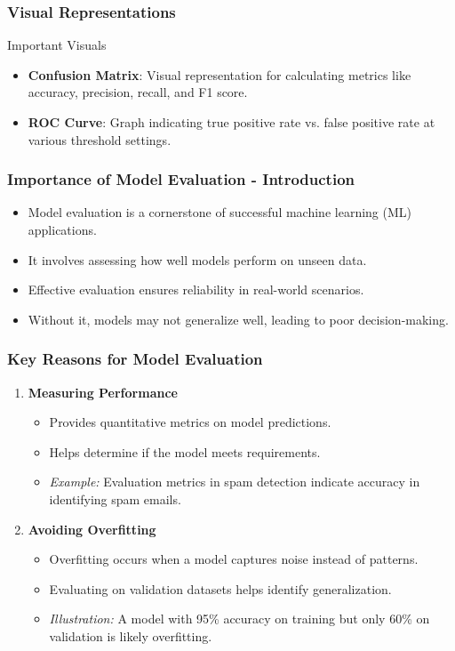 \documentclass[aspectratio=169]{beamer}
\begin{document}
\begin{frame}[fragile]
    \frametitle{Visual Representations}
    \begin{block}{Important Visuals}
        \begin{itemize}
            \item \textbf{Confusion Matrix}: Visual representation for calculating metrics like accuracy, precision, recall, and F1 score.
            \item \textbf{ROC Curve}: Graph indicating true positive rate vs. false positive rate at various threshold settings.
        \end{itemize}
    \end{block}
\end{frame}

\begin{frame}[fragile]
    \frametitle{Importance of Model Evaluation - Introduction}
    \begin{itemize}
        \item Model evaluation is a cornerstone of successful machine learning (ML) applications.
        \item It involves assessing how well models perform on unseen data.
        \item Effective evaluation ensures reliability in real-world scenarios.
        \item Without it, models may not generalize well, leading to poor decision-making.
    \end{itemize}
\end{frame}

\begin{frame}[fragile]
    \frametitle{Key Reasons for Model Evaluation}
    \begin{enumerate}
        \item \textbf{Measuring Performance}
            \begin{itemize}
                \item Provides quantitative metrics on model predictions.
                \item Helps determine if the model meets requirements.
                \item \textit{Example:} Evaluation metrics in spam detection indicate accuracy in identifying spam emails.
            \end{itemize}
        
        \item \textbf{Avoiding Overfitting}
            \begin{itemize}
                \item Overfitting occurs when a model captures noise instead of patterns.
                \item Evaluating on validation datasets helps identify generalization.
                \item \textit{Illustration:} A model with 95\% accuracy on training but only 60\% on validation is likely overfitting.
            \end{itemize}
    \end{enumerate}
\end{frame}
\end{document}

